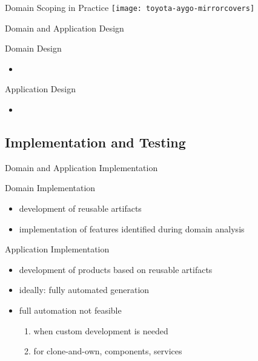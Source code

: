\begin{frame}{Domain Scoping in Practice}
	\centering\texttt{[image: toyota-aygo-mirrorcovers]}
\end{frame}

\begin{frame}{Domain and Application Design}
	\begin{mycolumns}[T,columns=3,widths={10}]
		\renewcommand{\projectcartoonwidth}{1}
	\mynextcolumn
		\begin{definition}{Domain Design}
			\begin{itemize}
				\item 
			\end{itemize}
		\end{definition}
	\mynextcolumn
		\begin{definition}{Application Design}
			\begin{itemize}
				\item 
			\end{itemize}
		\end{definition}
	\end{mycolumns}
\end{frame}

\subsection{Implementation and Testing}
\begin{frame}{Domain and Application Implementation}
	\begin{mycolumns}[T,columns=3,widths={10}]
		\renewcommand{\projectcartoonwidth}{1}
	\mynextcolumn
		\begin{definition}{Domain Implementation}
			\begin{itemize}
				\item development of reusable artifacts
				\item implementation of features identified during domain analysis
			\end{itemize}
		\end{definition}
	\mynextcolumn
		\begin{definition}{Application Implementation}
			\begin{itemize}
				\item development of products based on reusable artifacts
				\item ideally: fully automated generation
				\item full automation not feasible
					\begin{enumerate}
						\item when custom development is needed
						\item for clone-and-own, components, services
					\end{enumerate}
			\end{itemize}
		\end{definition}
	\end{mycolumns}
\end{frame}

